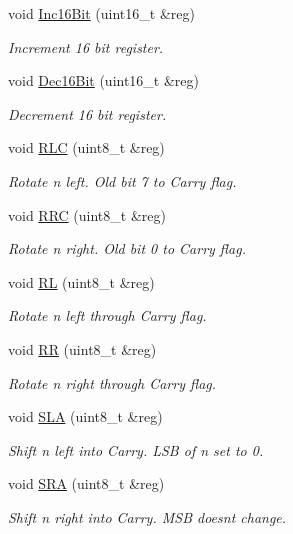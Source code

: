 \begin{DoxyCompactItemize}
void \mbox{\hyperlink{classCPU_aafc3e6a96e8216a8711e108f76eefd4d}{Inc16\+Bit}} (uint16\+\_\+t \&reg)
\begin{DoxyCompactList}\small\item\em Increment 16 bit register. \end{DoxyCompactList}\item 
void \mbox{\hyperlink{classCPU_acdf2564493c267699e8025b848eba871}{Dec16\+Bit}} (uint16\+\_\+t \&reg)
\begin{DoxyCompactList}\small\item\em Decrement 16 bit register. \end{DoxyCompactList}\item 
void \mbox{\hyperlink{classCPU_a4e6ea8564ac3750a304cc7aaeb568245}{R\+LC}} (uint8\+\_\+t \&reg)
\begin{DoxyCompactList}\small\item\em Rotate n left. Old bit 7 to Carry flag. \end{DoxyCompactList}\item 
void \mbox{\hyperlink{classCPU_a7d31c3685ebb8b751d9e7a2c92c03fc1}{R\+RC}} (uint8\+\_\+t \&reg)
\begin{DoxyCompactList}\small\item\em Rotate n right. Old bit 0 to Carry flag. \end{DoxyCompactList}\item 
void \mbox{\hyperlink{classCPU_a4c93dc3223ae7c2f47c81a5776dd0b93}{RL}} (uint8\+\_\+t \&reg)
\begin{DoxyCompactList}\small\item\em Rotate n left through Carry flag. \end{DoxyCompactList}\item 
void \mbox{\hyperlink{classCPU_ac1b7b67195fe563523a634dd0d6cbc17}{RR}} (uint8\+\_\+t \&reg)
\begin{DoxyCompactList}\small\item\em Rotate n right through Carry flag. \end{DoxyCompactList}\item 
void \mbox{\hyperlink{classCPU_aba8c43d11c2df8a2ff48de9b4165278e}{S\+LA}} (uint8\+\_\+t \&reg)
\begin{DoxyCompactList}\small\item\em Shift n left into Carry. L\+SB of n set to 0. \end{DoxyCompactList}\item 
void \mbox{\hyperlink{classCPU_a688b70d418da17a737ed2bbe3818a86b}{S\+RA}} (uint8\+\_\+t \&reg)
\begin{DoxyCompactList}\small\item\em Shift n right into Carry. M\+SB doesn\textquotesingle{}t change. \end{DoxyCompactList}\item 

\end{DoxyCompactItemize}
